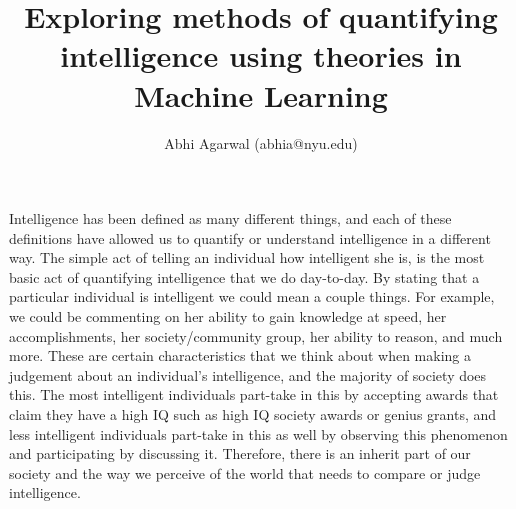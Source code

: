 \documentclass[11pt, oneside]{article}
\title{Exploring methods of quantifying intelligence using theories in Machine Learning}
\author{Abhi Agarwal (abhia@nyu.edu)}
\date{}
\begin{document}
\maketitle







\par Intelligence has been defined as many different things, and each of these definitions have allowed us to quantify or understand intelligence in a different way. The simple act of telling an individual how intelligent she is, is the most basic act of quantifying intelligence that we do day-to-day. By stating that a particular individual is intelligent we could mean a couple things. For example, we could be commenting on her ability to gain knowledge at speed, her accomplishments, her society/community group, her ability to reason, and much more. 
These are certain characteristics that we think about when making a judgement about an individual's intelligence, and the majority of society does this. The most intelligent individuals part-take in this by accepting awards that claim they have a high IQ such as high IQ society awards or genius grants, and less intelligent individuals part-take in this as well by observing this phenomenon and participating by discussing it. Therefore, there is an inherit part of our society and the way we perceive of the world that needs to compare or judge intelligence.
\end{document}
